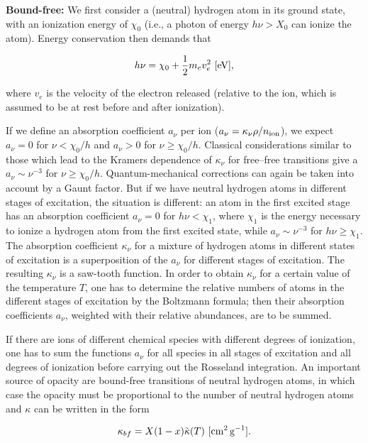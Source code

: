 \documentclass[a4paper,10pt]{article}
\begin{document}
{\noindent}\textbf{Bound-free:} We first consider a (neutral) hydrogen atom in its ground state, with an ionization energy of $\chi_0$ (i.e., a photon of energy $h\nu>X_0$ can ionize the atom). Energy conservation then demands that 

\begin{align*}
    h\nu = \chi_0 + \frac{1}{2}m_ev_e^2 ~ [{\rm eV}],
\end{align*}

{\noindent}where $v_e$ is the velocity of the electron released (relative to the ion, which is assumed to be at rest before and after ionization). 

{\noindent}If we define an absorption coefficient $a_\nu$ per ion ($a_\nu=\kappa_\nu\rho/n_{\rm ion}$), we expect $a_\nu=0$ for $\nu<\chi_0/h$ and $a_\nu>0$ for $\nu\geq\chi_0/h$. Classical considerations similar to those which lead to the Kramers dependence of $\kappa_\nu$ for free–free transitions give a $a_\nu\sim\nu^{-3}$ for $\nu\geq\chi_0/h$. Quantum-mechanical corrections can again be taken into account by a Gaunt factor. But if we have neutral hydrogen atoms in different stages of excitation, the situation is different: an atom in the first excited stage has an absorption coefficient $a_\nu=0$ for $h\nu<\chi_1$, where $\chi_1$ is the energy necessary to ionize a hydrogen atom from the first excited state, while $a_\nu\sim\nu^{-3}$ for $h\nu\geq\chi_1$. The absorption coefficient $\kappa_\nu$ for a mixture of hydrogen atoms in different states of excitation is a superposition of the $a_\nu$ for different stages of excitation. The resulting $\kappa_\nu$ is a saw-tooth function. In order to obtain $\kappa_\nu$ for a certain value of the temperature $T$, one has to determine the relative numbers of atoms in the different stages of excitation by the Boltzmann formula; then their absorption coefficients $a_\nu$, weighted with their relative abundances, are to be summed.

{\noindent}If there are ions of different chemical species with different degrees of ionization, one has to sum the functions $a_\nu$ for all species in all stages of excitation and all degrees of ionization before carrying out the Rosseland integration. An important source of opacity are bound-free transitions of neutral hydrogen atoms, in which case the opacity must be proportional to the number of neutral hydrogen atoms and $\kappa$ can be written in the form

\begin{align*}
    \kappa_{bf} = X(1-x)\tilde{\kappa}(T) ~ [{\rm cm^2\,g^{-1}}].
\end{align*}
\end{document}

